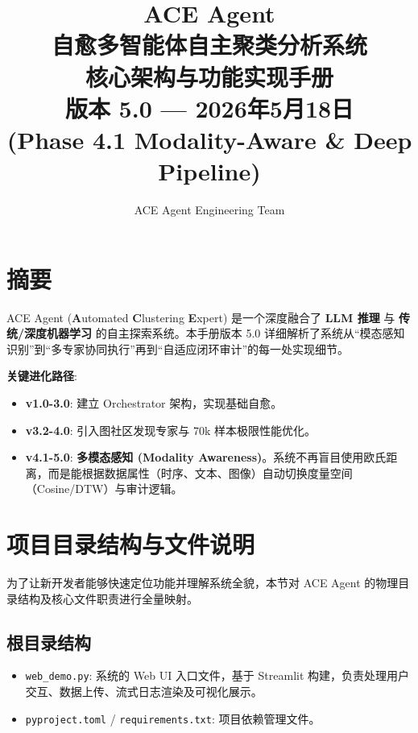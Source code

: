 \documentclass[12pt,a4paper]{article}
\title{
    \textbf{ACE Agent}\\[4pt]
    \large 自愈多智能体自主聚类分析系统\\[6pt]
    \Large 核心架构与功能实现手册\\[12pt]
    \normalsize 版本 5.0 — 2026年5月18日\\
    \normalsize (Phase 4.1 Modality-Aware \& Deep Pipeline)
}
\author{ACE Agent Engineering Team}
\date{}
\begin{document}
\maketitle
\tableofcontents
\newpage

\section{摘要}

ACE Agent (\textbf{A}utomated \textbf{C}lustering \textbf{E}xpert) 是一个深度融合了 \textbf{LLM 推理} 与 \textbf{传统/深度机器学习} 的自主探索系统。本手册版本 5.0 详细解析了系统从“模态感知识别”到“多专家协同执行”再到“自适应闭环审计”的每一处实现细节。

\textbf{关键进化路径}:
\begin{itemize}[nosep]
    \item \textbf{v1.0-3.0}: 建立 Orchestrator 架构，实现基础自愈。
    \item \textbf{v3.2-4.0}: 引入图社区发现专家与 70k 样本极限性能优化。
    \item \textbf{v4.1-5.0}: \textbf{多模态感知 (Modality Awareness)}。系统不再盲目使用欧氏距离，而是能根据数据属性（时序、文本、图像）自动切换度量空间（Cosine/DTW）与审计逻辑。
\end{itemize}

\newpage

\section{项目目录结构与文件说明}

为了让新开发者能够快速定位功能并理解系统全貌，本节对 ACE Agent 的物理目录结构及核心文件职责进行全量映射。

\subsection{根目录结构}
\begin{itemize}[nosep]
    \item \texttt{web\_demo.py}: 系统的 Web UI 入口文件，基于 Streamlit 构建，负责处理用户交互、数据上传、流式日志渲染及可视化展示。
    \item \texttt{pyproject.toml} / \texttt{requirements.txt}: 项目依赖管理文件。
\end{itemize}
\end{document}
